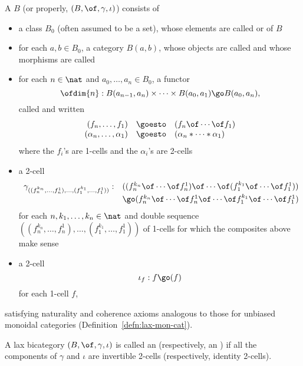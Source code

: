 \begin{defn}	
A  $B$ (or properly, $(B, \of, \gamma, \iota)$)
consists of
%
\begin{itemize}
\item a class $B_0$ (often assumed to be a set), whose elements are called
 or %
%
%
of $B$
\item for each $a,b\in B_0$, a category $B(a,b)$, whose objects are called
 and whose morphisms are called 
\item for each $n\in \nat$ and $a_0, \ldots, a_n \in B_0$, a functor 
\[
\ofdim{n}: B(a_{n-1}, a_n) \times \cdots \times B(a_0, a_1)
\go
B(a_0, a_n),
\]%
% 
%
% 
called  and written
\[
\begin{array}{rcl}
(f_n, \ldots, f_1) 	&\goesto	&(f_n \of\cdots\of f_1)		\\
(\alpha_n, \ldots, \alpha_1)	
			&\goesto
					&(\alpha_n * \cdots * \alpha_1)
\end{array}
\]%
% 
%
% 
where the $f_i$'s are 1-cells and the $\alpha_i$'s are 2-cells
\item 
a 2-cell
\[
\begin{array}{rl}
\gamma_{((f_n^{k_n}, \ldots, f_n^1), \ldots, (f_1^{k_1}, \ldots,
f_1^1))}: &
((f_n^{k_n} \of \cdots \of f_n^1) \of \cdots \of
(f_1^{k_1} \of \cdots \of f_1^1))\\
&\go 
(f_n^{k_n} \of\cdots\of f_n^1 \of\cdots\of f_1^{k_1}
\of\cdots\of f_1^1)
\end{array}
\]%
% 
%
% 
for each $n, k_1, \ldots, k_n \in \nat$ and double sequence $((f_n^{k_n},
\ldots, f_n^1), \ldots, (f_1^{k_1}, \ldots, f_1^1))$ of 1-cells for which
the composites above make sense
\item a 2-cell
\[
\iota_f: f \go (f)
\]%
% 
%
% 
for each 1-cell $f$,
\end{itemize}
%
satisfying naturality and coherence axioms analogous to those for unbiased
monoidal categories (Definition~\ref{defn:lax-mon-cat}).

A lax bicategory $(B, \of, \gamma, \iota)$ is called an  (respectively, an ) if all
the components of $\gamma$ and $\iota$ are invertible 2-cells
(respectively, identity 2-cells).
\end{defn}


